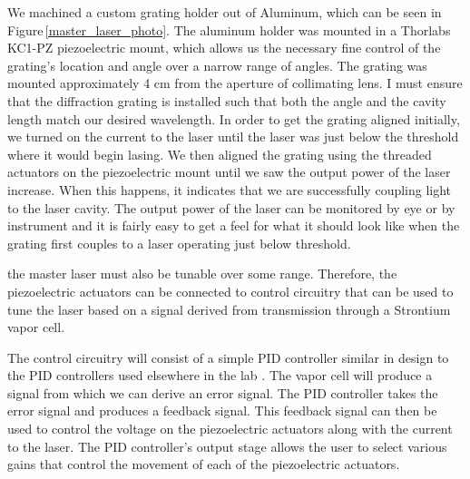  We machined a custom grating holder out of Aluminum, which can be seen in Figure\,\ref{master_laser_photo}. The aluminum holder was mounted in a Thorlabs KC1-PZ piezoelectric mount, which allows us the necessary fine control of the grating's location and angle over a narrow range of angles.  The grating was mounted approximately 4 cm from the aperture of collimating lens.
I must ensure that the diffraction grating is installed such that both the angle and the cavity length match our desired wavelength. In order to get the grating aligned initially, we turned on the current to the laser until the laser was just below the threshold where it would begin lasing. We then aligned the grating using the threaded actuators on the piezoelectric mount until we saw the output power of the laser increase. When this happens, it indicates that we are successfully coupling light to the laser cavity. The output power of the laser can be monitored by eye or by instrument and it is fairly easy to get a feel for what it should look like when the grating first couples to a laser operating just below threshold.

the master laser must also be tunable over some range. Therefore, the piezoelectric actuators can be connected to control circuitry that can be used to tune the laser based on a signal derived from transmission through a Strontium vapor cell. 

The control circuitry will consist of a simple PID controller similar in design to the PID controllers used elsewhere in the lab \cite{cjeDiss}. The vapor cell will produce a signal from which we can derive an error signal. The PID controller takes the error signal and produces a feedback signal. This feedback signal can then be used to control the voltage on the piezoelectric actuators along with the current to the laser. The PID controller's output stage allows the user to select various gains that control the movement of each of the piezoelectric actuators. 

